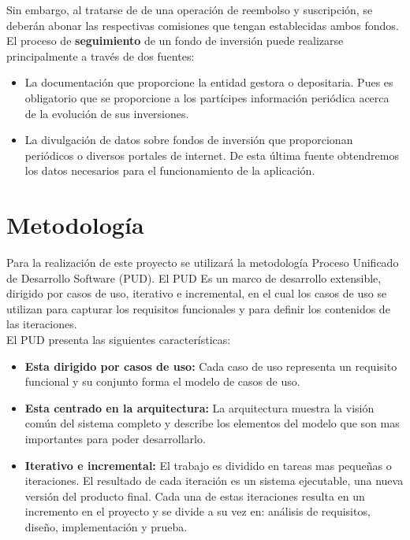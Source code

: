 \documentclass[12pt, a4paper]{article}
\begin{document}
Sin embargo, al tratarse de de una operación de reembolso y suscripción, se deberán abonar las respectivas comisiones que tengan establecidas ambos fondos.\\ 

El proceso de \textbf{seguimiento} de un fondo de inversión puede realizarse principalmente a través de dos fuentes:
\begin{itemize}
	\item La documentación que proporcione la entidad gestora o depositaria. Pues es obligatorio que se proporcione a los partícipes información periódica acerca de la evolución de sus inversiones.
	\item La divulgación de datos sobre fondos de inversión que proporcionan periódicos o diversos portales de internet. De esta última fuente obtendremos los datos necesarios para el funcionamiento de la aplicación.
\end{itemize}
\newpage

\part{Metodología}

Para la realización de este proyecto se utilizará la metodología Proceso Unificado de Desarrollo Software (PUD). El PUD Es un marco de desarrollo extensible, dirigido por casos de uso, iterativo e incremental, en el cual los casos de uso se utilizan para capturar los requisitos funcionales y para definir los contenidos de las iteraciones.\\

El PUD presenta las siguientes características:

\begin{itemize}
	\item \textbf{Esta dirigido por casos de uso:} Cada caso de uso representa un requisito funcional y su conjunto forma el modelo de casos de uso.
	\item \textbf{Esta centrado en la arquitectura:} La arquitectura muestra la visión común del sistema completo y describe los elementos del modelo que son mas importantes para poder desarrollarlo.
	\item \textbf{Iterativo e incremental: } El trabajo es dividido en tareas mas pequeñas o iteraciones. El resultado de cada iteración es un sistema ejecutable, una nueva versión del producto final. Cada una de estas iteraciones resulta en un incremento en el proyecto y se divide a su vez en: análisis de requisitos, diseño, implementación y prueba.
\end{itemize}
\end{document}
